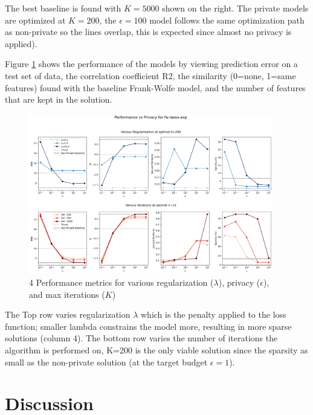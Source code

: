 \documentclass[12pt,letterpaper]{article}
\begin{document}
The best baseline is found with $K=5000$ shown on the right. The private models are optimized at $K=200$, the $\epsilon=100$ model follows the same optimization path as non-private so the lines overlap, this is expected since almost no privacy is applied).

Figure \ref{fig:lasso_results} shows the performance of the models by viewing prediction error on a test set of data, the correlation coefficient R2, the similarity (0=none, 1=same features) found with the baseline Frank-Wolfe model, and the number of features that are kept in the solution.

\begin{figure}[H]
    \centering
    \includegraphics[width=0.95\textwidth]{figure/lasso_results.png}
    \caption{4 Performance metrics for various regularization ($\lambda$), privacy ($\epsilon$), and max iterations ($K$)}
    \label{fig:lasso_results}
\end{figure}

The Top row varies regularization $\lambda$ which is the penalty applied to the loss function; smaller lambda constrains the model more, resulting in more sparse solutions (column 4). The bottom row varies the number of iterations the algorithm is performed on, K=200 is the only viable solution since the sparsity as small as the non-private solution (at the target budget $\epsilon=1$).




\section{Discussion}
\end{document}
